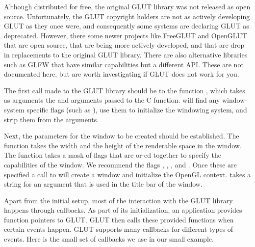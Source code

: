 \begin{commonerrors}
  Although distributed for free, the original GLUT library was not released
  as open source. Unfortunately, the GLUT copyright holders are not as
  actively developing GLUT as they once were, and consequently some systems
  are declaring GLUT as deprecated. However, there some newer projects like
  FreeGLUT and OpenGLUT that are open source, that are being more actively
  developed, and that are drop in replacements to the original GLUT
  library. There are also alternative libraries such as GLFW that have
  similar capabilities but a different API. These are not documented here,
  but are worth investigating if GLUT does not work for you.
\end{commonerrors}

The first call made to the GLUT library should be to the function
, which takes as arguments the  and
 arguments passed to the  C function.
 will find any window-system specific flags (such as
), use them to initialize the windowing system, and
strip them from the arguments.

Next, the parameters for the window to be created should be established.
The function  takes the width and the height
of the renderable space in the window. The function
 takes a mask of flags that are or-ed
together to specify the capabilities of the window. We recommend the flags
, , , and
. Once these are specified a call to
 will create a window and initialize the OpenGL
context.  takes a string for an argument that is
used in the title bar of the window.



Apart from the initial setup, most of the interaction with the GLUT
library happens through callbacks. As part of its initialization, an
application provides function pointers to GLUT. GLUT then calls these
provided functions when certain events happen. GLUT supports many callbacks
for different types of events. Here is the small set of callbacks we use in
our small example.

